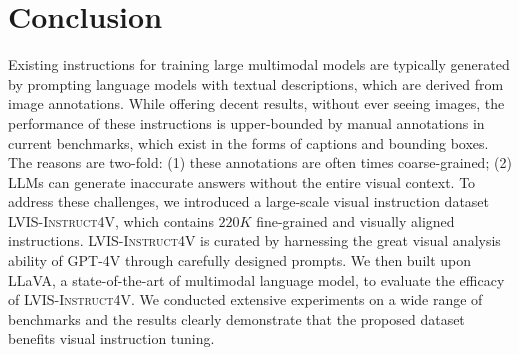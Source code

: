 \documentclass{article}
\newcommand{\dataname}{\textsc{LVIS-Instruct4V}\xspace}
\begin{document}
 \section{Conclusion}
\label{sec:conclusion}
Existing instructions for training large multimodal models are typically generated by prompting language models with textual descriptions, which are derived from image annotations. While offering decent results, without ever seeing images, the performance of these instructions is upper-bounded by manual annotations in current benchmarks, which exist in the forms of captions and bounding boxes.  The reasons are two-fold: (1) these annotations are often times coarse-grained; (2) LLMs can generate inaccurate answers without the entire visual context. To address these challenges, we introduced a large-scale visual instruction dataset \dataname, which contains $220K$ fine-grained and visually aligned instructions. \dataname is curated by harnessing the great visual analysis ability of GPT-4V through carefully designed prompts. We then built upon LLaVA, a state-of-the-art of multimodal language model, to evaluate the efficacy of \dataname. We conducted extensive experiments on a wide range of benchmarks and the results clearly demonstrate that the proposed dataset benefits visual instruction tuning. 






\appendix
\onecolumn
\end{document}
